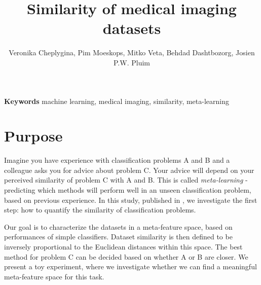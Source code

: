 \documentclass{llncs}
\begin{document}
\title{Similarity of medical imaging datasets}


\author{Veronika Cheplygina, Pim Moeskops, Mitko Veta, Behdad Dashtbozorg, Josien P.W. Pluim}



\maketitle


\noindent \textbf{Keywords} machine learning, medical imaging, similarity, meta-learning

\section{Purpose}

Imagine you have experience with classification problems A and B and a colleague asks you for advice about problem C. Your advice will depend on your perceived similarity of problem C with A and B. This is called \emph{meta-learning} - predicting which methods will perform well in an unseen classification problem, based on previous experience. In this study, published in \cite{cheplygina2017exploring}, we investigate the first step: how to quantify the similarity of classification problems.

Our goal is to characterize the datasets in a meta-feature space, based on performances of simple classifiers. Dataset similarity is then defined to be inversely proportional to the Euclidean distances within this space. The best method for problem C can be decided based on whether A or B are closer. We present a toy experiment, where we investigate whether we can find a meaningful meta-feature space for this task. 
\end{document}
